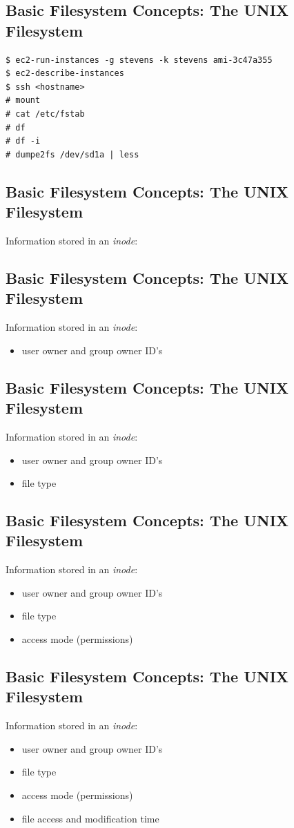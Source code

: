 \documentclass[xga]{xdvislides}
\begin{document}
\subsection{Basic Filesystem Concepts: The UNIX Filesystem}
\begin{verbatim}
$ ec2-run-instances -g stevens -k stevens ami-3c47a355
$ ec2-describe-instances
$ ssh <hostname>
# mount
# cat /etc/fstab
# df
# df -i
# dumpe2fs /dev/sd1a | less
\end{verbatim}


\subsection{Basic Filesystem Concepts: The UNIX Filesystem}
Information stored in an {\em inode}:

\subsection{Basic Filesystem Concepts: The UNIX Filesystem}
Information stored in an {\em inode}:
\begin{itemize}
	\item user owner and group owner ID's
\end{itemize}

\subsection{Basic Filesystem Concepts: The UNIX Filesystem}
Information stored in an {\em inode}:
\begin{itemize}
	\item user owner and group owner ID's
	\item file type
\end{itemize}

\subsection{Basic Filesystem Concepts: The UNIX Filesystem}
Information stored in an {\em inode}:
\begin{itemize}
	\item user owner and group owner ID's
	\item file type
	\item access mode (permissions)
\end{itemize}

\subsection{Basic Filesystem Concepts: The UNIX Filesystem}
Information stored in an {\em inode}:
\begin{itemize}
	\item user owner and group owner ID's
	\item file type
	\item access mode (permissions)
	\item file access and modification time
\end{itemize}
\end{document}
